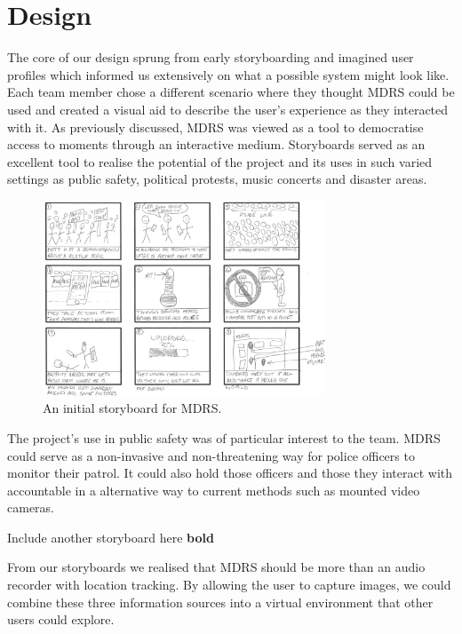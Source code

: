 \documentclass{l3proj}
\begin{document}
\chapter{Design}
\label{design}

The core of our design sprung from early storyboarding and imagined user
profiles which informed us extensively on what a possible system might look
like. Each team member chose a different scenario where they thought MDRS could be used and created a visual aid to describe the user's experience as they interacted with it. As previously discussed, MDRS was viewed as a tool to democratise access to moments through an interactive medium. Storyboards served as an excellent tool to realise the potential of the project and its uses in such varied settings as public safety, political protests, music concerts and disaster areas.

\begin{figure}[ht!]
\centering
\includegraphics[width=0.75\textwidth]{images/ally-storyboard.jpg}
\caption{An initial storyboard for MDRS.}
\end{figure}

The project's use in public safety was of particular interest to the team. MDRS could serve as a non-invasive and non-threatening way for police officers to monitor their patrol. It could also hold those officers and those they interact with accountable in a alternative way to current methods such as mounted video cameras.

Include another storyboard here {\bf bold}

From our storyboards we realised that MDRS should be more than an audio recorder with location tracking. By allowing the user to capture images, we could combine these three information sources into a virtual environment that other users could explore.
\end{document}
